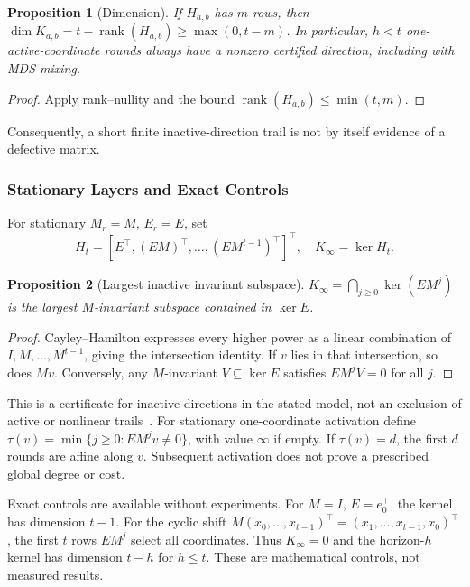 \documentclass[conference]{IEEEtran}
\theoremstyle{definition}
\theoremstyle{plain}
\newtheorem{proposition}{Proposition}
\begin{document}
\begin{proposition}[Dimension]
\label{prop:dimension}
If $H_{a,b}$ has $m$ rows, then
$\dim K_{a,b}=t-\operatorname{rank}(H_{a,b})\ge\max(0,t-m)$.
In particular, $h<t$ one-active-coordinate rounds always have a
nonzero certified direction, including with MDS mixing.
\end{proposition}
\begin{proof}
Apply rank--nullity and the bound
$\operatorname{rank}(H_{a,b})\le\min(t,m)$.
\end{proof}
Consequently, a short finite inactive-direction trail is not by itself
evidence of a defective matrix.

\subsubsection{Stationary Layers and Exact Controls}
For stationary $M_r=M$, $E_r=E$, set
\begin{equation}
H_t=[E^\top,(EM)^\top,\ldots,(EM^{t-1})^\top]^\top,
\quad K_\infty=\ker H_t.
\label{eq:stationary}
\end{equation}
\begin{proposition}[Largest inactive invariant subspace]
$K_\infty=\bigcap_{j\ge0}\ker(EM^j)$ is the largest $M$-invariant
subspace contained in $\ker E$.
\end{proposition}
\begin{proof}
Cayley--Hamilton expresses every higher power as a linear combination
of $I,M,\ldots,M^{t-1}$, giving the intersection identity.
If $v$ lies in that intersection, so does $Mv$. Conversely, any
$M$-invariant $V\subseteq\ker E$ satisfies $EM^jV=0$ for all $j$.
\end{proof}
This is a certificate for inactive directions in the stated model,
not an exclusion of active or nonlinear trails~\cite{weaklayers2020,nonlinear2026}.
For stationary one-coordinate activation define
$\tau(v)=\min\{j\ge0:EM^jv\ne0\}$, with value $\infty$ if empty.
If $\tau(v)=d$, the first $d$ rounds are affine along $v$.
Subsequent activation does not prove a prescribed global degree or cost.

Exact controls are available without experiments.
For $M=I$, $E=e_0^\top$, the kernel has dimension $t-1$.
For the cyclic shift
$M(x_0,\ldots,x_{t-1})^\top=(x_1,\ldots,x_{t-1},x_0)^\top$,
the first $t$ rows $EM^j$ select all coordinates.
Thus $K_\infty=0$ and the horizon-$h$ kernel has dimension $t-h$
for $h\le t$. These are mathematical controls, not measured results.
\end{document}
